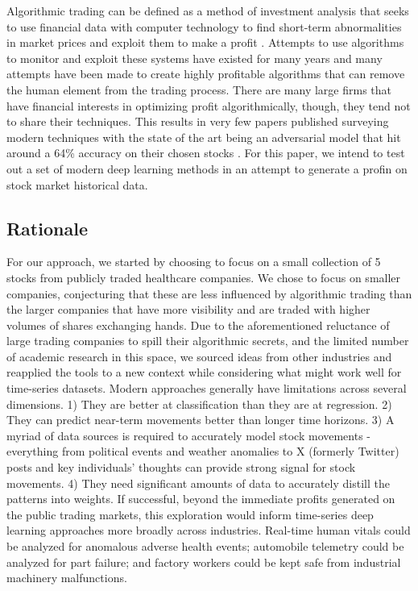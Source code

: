 \documentclass[10pt,twocolumn,letterpaper]{article}
\begin{document}
Algorithmic trading can be defined as a method of investment analysis that seeks to use financial data with computer technology to find short-term abnormalities in market prices and exploit them to make a profit \cite{wang2021survey}. Attempts to use algorithms to monitor and exploit these systems have existed for many years and many attempts have been made to create highly profitable algorithms that can remove the human element from the trading process. There are many large firms that have financial interests in optimizing profit algorithmically, though, they tend not to share their techniques. This results in very few papers published surveying modern techniques with the state of the art being an adversarial model that hit around a 64\% accuracy on their chosen stocks \cite{STLAT_sota}. For this paper, we intend to test out a set of modern deep learning methods in an attempt to generate a profin on stock market historical data.

\subsection{Rationale}

For our approach, we started by choosing to focus on a small collection of 5 stocks from publicly traded healthcare companies. We chose to focus on smaller companies, conjecturing that these are less influenced by algorithmic trading than the larger companies that have more visibility and are traded with higher volumes of shares exchanging hands. Due to the aforementioned reluctance of large trading companies to spill their algorithmic secrets, and the limited number of academic research in this space, we sourced ideas from other industries and reapplied the tools to a new context while considering what might work well for time-series datasets.
Modern approaches generally have limitations across several dimensions. 1) They are better at classification than they are at regression. 2) They can predict near-term movements better than longer time horizons. 3) A myriad of data sources is required to accurately model stock movements - everything from political events and weather anomalies to X (formerly Twitter) posts and key individuals’ thoughts can provide strong signal for stock movements. 4) They need significant amounts of data to accurately distill the patterns into weights.
If successful, beyond the immediate profits generated on the public trading markets, this exploration would inform time-series deep learning approaches more broadly across industries. Real-time human vitals could be analyzed for anomalous adverse health events; automobile telemetry could be analyzed for part failure; and factory workers could be kept safe from industrial machinery malfunctions.
\end{document}
